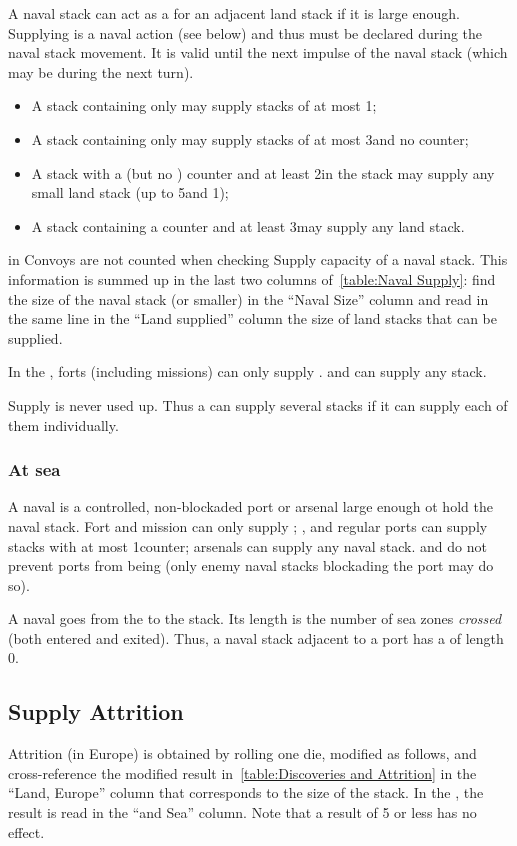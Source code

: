 A naval stack can act as a \SoS for an adjacent land stack if it is large
enough. Supplying is a naval action (see below) and thus must be declared
during the naval stack movement. It is valid until the next impulse of the
naval stack (which may be during the next turn).
\begin{itemize}
\item A stack containing only \NDE may supply stacks of at most 1\LD;
\item A stack containing only \ND may supply stacks of at most 3\LD and no
  \ARMY counter;
\item A stack with a \FLEET\facemoins (but no \FLEET\faceplus) counter and at
  least 2\ND in the stack may supply any small land stack (up to 5\LD and
  1\Pasha);
\item A stack containing a \FLEET\faceplus counter and at least 3\ND may
  supply any land stack.
\end{itemize}
\NTD in Convoys are not counted when checking Supply capacity of a naval
stack. This information is summed up in the last two columns
of~\ref{table:Naval Supply}: find the size of the naval stack (or smaller) in
the ``Naval Size'' column and read in the same line in the ``Land supplied''
column the size of land stacks that can be supplied.


In the \ROTW, forts (including missions) can only supply \LD. \TP and \COL can
supply any stack.

Supply is never used up. Thus a \SoS can supply several stacks if it can
supply each of them individually.

\subsubsection{At sea}
A naval \SoS is a controlled, non-blockaded port or arsenal large enough ot
hold the naval stack. Fort and mission can only supply \ND; \TP, \COL and
regular ports can supply stacks with at most 1\FLEET counter; arsenals can
supply any naval stack. \Presidios and \USURE do not prevent ports from being
\SoS (only enemy naval stacks blockading the port may do so).

A naval \LoS goes from the \SoS to the stack. Its length is the number of sea
zones \emph{crossed} (both entered and exited). Thus, a naval stack adjacent
to a port has a \LoS of length 0.

\subsection{Supply Attrition}
Attrition (in Europe) is obtained by rolling one die, modified as follows, and
cross-reference the modified result in~\ref{table:Discoveries and
  Attrition} in the ``Land, Europe'' column that corresponds to the size of
the stack. In the \ROTW, the result is read in the ``\ROTW and Sea''
column. Note that a result of 5 or less has no effect.

